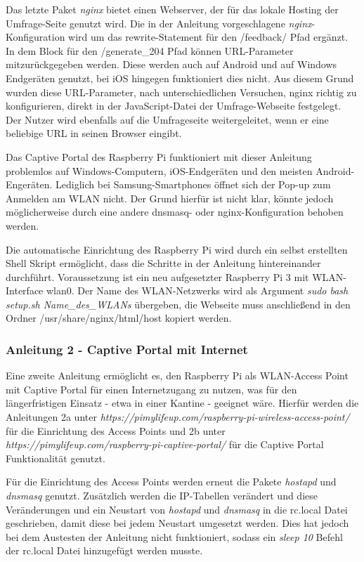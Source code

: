 Das letzte Paket \textit{nginx} bietet einen Webserver, der für das lokale Hosting der Umfrage-Seite genutzt wird. Die in der Anleitung vorgeschlagene \textit{nginx}-Konfiguration wird um das rewrite-Statement für den /feedback/ Pfad ergänzt. In dem Block für den /generate\_204 Pfad können URL-Parameter mitzurückgegeben werden. Diese werden auch auf Android und auf Windows Endgeräten genutzt, bei iOS hingegen funktioniert dies nicht. Aus diesem Grund wurden diese URL-Parameter, nach unterschiedlichen Versuchen, nginx richtig zu konfigurieren, direkt in der JavaScript-Datei der Umfrage-Webseite festgelegt. Der Nutzer wird ebenfalls auf die Umfrageseite weitergeleitet, wenn er eine beliebige URL in seinen Browser eingibt.

Das Captive Portal des Raspberry Pi funktioniert mit dieser Anleitung problemlos auf Windows-Computern, iOS-Endgeräten und den meisten Android-Engeräten. Lediglich bei Samsung-Smartphones öffnet sich der Pop-up zum Anmelden am WLAN nicht. Der Grund hierfür ist nicht klar, könnte jedoch möglicherweise durch eine andere dnsmasq- oder nginx-Konfiguration behoben werden.

Die automatische Einrichtung des Raspberry Pi wird durch ein selbst erstellten Shell Skript ermöglicht, dass die Schritte in der Anleitung hintereinander durchführt. Voraussetzung ist ein neu aufgesetzter Raspberry Pi 3 mit WLAN-Interface wlan0. Der Name des WLAN-Netzwerks wird als Argument \textit{sudo bash setup.sh Name\_des\_WLANs} übergeben, die Webseite muss anschließend in den Ordner /usr/share/nginx/html/host kopiert werden.

\subsubsection*{Anleitung 2 - Captive Portal mit Internet}
Eine zweite Anleitung ermöglicht es, den Raspberry Pi als WLAN-Access Point mit Captive Portal für einen Internetzugang zu nutzen, was für den längerfristigen Einsatz - etwa in einer Kantine - geeignet wäre. Hierfür werden die Anleitungen 2a unter \textit{https://pimylifeup.com/raspberry-pi-wireless-access-point/} für die Einrichtung des Access Points und 2b unter \textit{https://pimylifeup.com/raspberry-pi-captive-portal/} für die Captive Portal Funktionalität genutzt.

Für die Einrichtung des Access Points werden erneut die Pakete \textit{hostapd} und \textit{dnsmasq} genutzt. Zusätzlich werden die IP-Tabellen verändert und diese Veränderungen und ein Neustart von \textit{hostapd} und \textit{dnsmasq} in die rc.local Datei geschrieben, damit diese bei jedem Neustart umgesetzt werden. Dies hat jedoch bei dem Austesten der Anleitung nicht funktioniert, sodass ein \textit{sleep 10} Befehl der rc.local Datei hinzugefügt werden musste.

